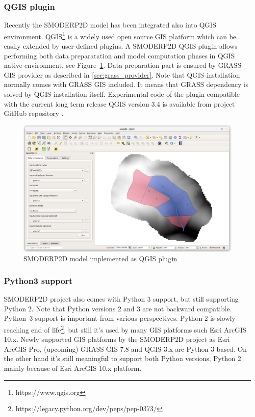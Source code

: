\subsubsection{QGIS plugin}
Recently the SMODERP2D model has been integrated also into QGIS
environment. QGIS\footnote{https://www.qgis.org} is a widely used open
source GIS platform which can be easily extended by user-defined
plugins. A SMODERP2D QGIS plugin allows performing both data
preparatation and model computation phases in QGIS native environment,
see Figure~\ref{fig:smoderp2_qgis}. Data preparation part is ensured by
GRASS GIS provider as described in \ref{sec:grass_provider}. Note that
QGIS installation normally comes with GRASS GIS included. It means
that GRASS dependency is solved by QGIS installation
itself. Experimental code of the plugin compatible with the current
long term release QGIS version 3.4 is available from project GitHub
repository \cite{smoderp2d-github-2019}.

\begin{figure}[ht!]
  \begin{center}
    \includegraphics[width=1.0\columnwidth]{figures/smoderp2d_qgis.png}
    \caption{SMODERP2D model implemented as QGIS plugin}
    \label{fig:smoderp2_qgis}
  \end{center}
\end{figure}

\subsubsection{Python3 support}
SMODERP2D project also comes with Python 3 support, but still
supporting Python 2. Note that Python versions 2 and 3 are not
backward compatible.  Python~3 support is important from various
perspectives. Python 2 is slowly reaching end of
life\footnote{https://legacy.python.org/dev/peps/pep-0373/}, but still
it’s used by many GIS platforms such Esri ArcGIS 10.x. Newly supported
GIS platforms by the SMODERP2D project as Esri ArcGIS Pro, (upcoming)
GRASS GIS 7.8 and QGIS 3.x are Python 3 based. On the other hand it’s
still meaningful to support both Python versions, Python 2 mainly
because of Esri ArcGIS 10.x platform.

